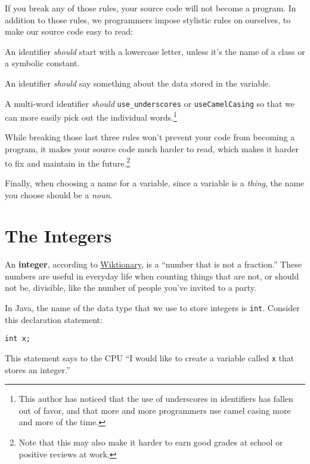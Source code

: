 If you break any of those rules, your source code will not become a program.  In addition to those rules, we programmers impose stylistic rules on ourselves, to make our source code easy to read:

\bi
\item An identifier \textit{should} start with a lowercase letter, unless it's the name of a class or a symbolic constant.
\item An identifier \textit{should} say something about the data stored in the variable.
\item A multi-word identifier \textit{should} \lstinline{use_underscores} or \lstinline{useCamelCasing} so that we can more easily pick out the individual words.\footnote{This author has noticed that the use of underscores in identifiers has fallen out of favor, and that more and more programmers use camel casing more and more of the time.}
\ei

While breaking those last three rules won't prevent your code from becoming a program, it makes your source code much harder to read, which makes it harder to fix and maintain in the future.\footnote{Note that this may also make it harder to earn good grades at school or positive reviews at work.}

Finally, when choosing a name for a variable, since a variable is a \textit{thing}, the name you choose should be a \textit{noun}.

\section{The Integers}
\label{sec:integers}

An \textbf{integer}, according to \href{https://en.wiktionary.org/wiki/integer}{Wiktionary}, is a ``number that is not a fraction.''  These numbers are useful in everyday life when counting things that are not, or should not be, divisible, like the number of people you've invited to a party.

In Java, the name of the data type that we use to store integers is \texttt{int}.  Consider this declaration statement:

\begin{verbatim}
int x;
\end{verbatim}

This statement says to the CPU ``I would like to create a variable called \texttt{x} that stores an integer.''

